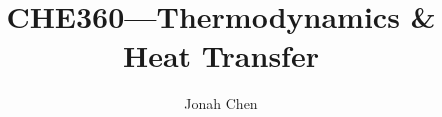 \documentclass[a4paper]{article}
\title{CHE360---Thermodynamics \& Heat Transfer}
\author{Jonah Chen}
\numberwithin{equation}{section}
\begin{document}
    \maketitle
    \tableofcontents

    \section{}
\end{document}
